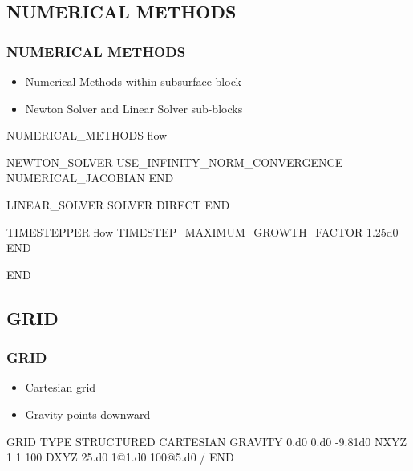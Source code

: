 \documentclass{beamer}
\begin{document}
\subsection{NUMERICAL METHODS}
\begin{frame}[fragile]\frametitle{NUMERICAL METHODS}

\begin{itemize}
  \item Numerical Methods within subsurface block
  \item Newton Solver and Linear Solver sub-blocks
\end{itemize}

\begin{semiverbatim}
NUMERICAL_METHODS flow

  NEWTON_SOLVER
    USE_INFINITY_NORM_CONVERGENCE
    NUMERICAL_JACOBIAN
  END

  LINEAR_SOLVER
    SOLVER DIRECT
  END

  TIMESTEPPER flow
    TIMESTEP_MAXIMUM_GROWTH_FACTOR 1.25d0
  END

END

\end{semiverbatim}
\end{frame}
\subsection{GRID}
\begin{frame}\frametitle{GRID}

\begin{itemize}
  \item Cartesian grid
  \item Gravity points downward
\end{itemize}

\begin{semiverbatim}
GRID
  TYPE STRUCTURED CARTESIAN
  GRAVITY 0.d0 0.d0 -9.81d0
  NXYZ 1 1 100
  DXYZ
    25.d0
    1@1.d0
    100@5.d0
  /
END
\end{semiverbatim}

\end{frame}
\end{document}
